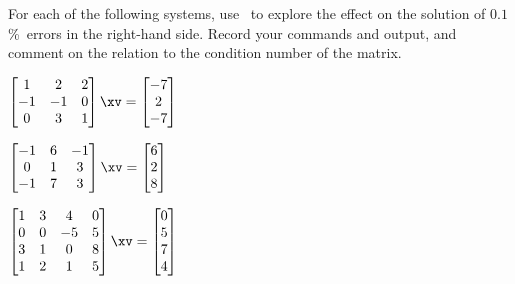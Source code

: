 \begin{exercise}  
For each of the following systems, use \script\ to explore the effect on the solution of \(0.1\)\%~errors in the right-hand side.
Record your commands and output, and comment on the relation to the  condition number of the matrix.

\begin{Parts}

\item \(\begin{bmatrix} 1&2&2
\\-1&-1&0
\\0&3&1 \end{bmatrix}\xv
=\begin{bmatrix} -7
\\2
\\-7 \end{bmatrix}\)
\setbox\ajrqrbox\hbox{}%
\marginajrbox%

\begin{OmitV1}
\item \(\begin{bmatrix} -1&6&-1
\\0&1&3
\\-1&7&3 \end{bmatrix}\xv
=\begin{bmatrix} 6
\\2
\\8 \end{bmatrix}\)
\setbox\ajrqrbox\hbox{}%
\marginajrbox%

\item \(\begin{bmatrix} 1&3&4&0
\\0&0&-5&5
\\3&1&0&8
\\1&2&1&5 \end{bmatrix}\xv
=\begin{bmatrix} 0
\\5
\\7
\\4 \end{bmatrix}\)
\setbox\ajrqrbox\hbox{}%
\marginajrbox%
\end{OmitV1}


\end{Parts}
\end{exercise}
